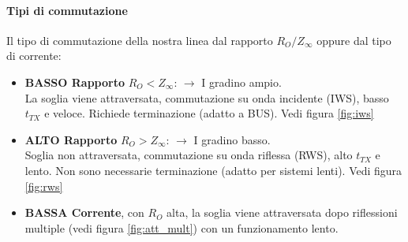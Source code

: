 \documentclass[12pt]{article}
\begin{document}
\paragraph{Tipi di commutazione} Il tipo di commutazione della nostra linea dal rapporto $R_{O}/Z_{\infty}$ oppure dal tipo di corrente:
\begin{itemize}
  \item \textbf{BASSO Rapporto} $R_{O}<Z_{\infty}$: $\rightarrow$ I gradino ampio.\\ La soglia viene attraversata, commutazione su onda incidente (IWS), basso $t_{TX}$ e veloce. Richiede terminazione (adatto a BUS). Vedi figura \ref{fig:iws}
  \item \textbf{ALTO Rapporto} $R_{O}>Z_{\infty}$: $\rightarrow$ I gradino basso.\\ Soglia non attraversata, commutazione su onda riflessa (RWS), alto $t_{TX}$ e lento. Non sono necessarie terminazione (adatto per sistemi lenti). Vedi figura \ref{fig:rws}
  \item \textbf{BASSA Corrente}, con $R_{O}$ alta, la soglia viene attraversata dopo riflessioni multiple (vedi figura \ref{fig:att_mult}) con un funzionamento lento.
\end{itemize}
\end{document}
